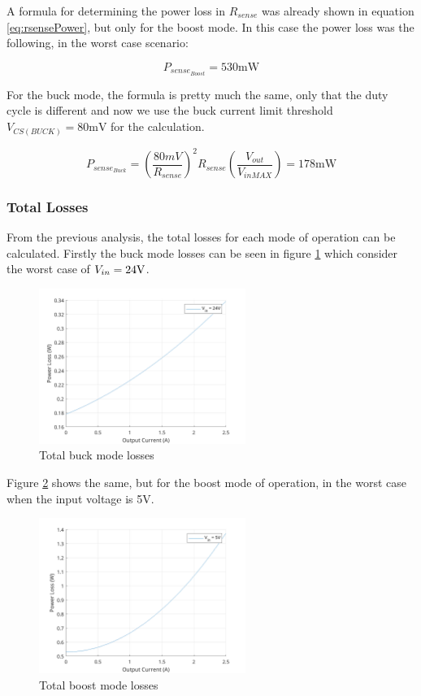 \documentclass[11pt, a4paper]{article}
\begin{document}
A formula for determining the power loss in $R_{sense}$ was already shown in equation \ref{eq:rsensePower}, but only for the boost mode. In this case the power loss was the following, in the worst case scenario:

$$P_{sense_{Boost}} = 530\text{mW}$$

For the buck mode, the formula is pretty much the same, only that the duty cycle is different and now we use the buck current limit threshold $V_{CS(BUCK)} = 80\text{mV}$ for the calculation.

\begin{equation}
    P_{sense_{Buck}} = \left (\frac{80mV}{R_{sense}}\right )^2R_{sense}\left (\frac{V_{out}}{V_{inMAX}}\right ) = 178 \text{mW}
\end{equation}

\subsubsection{Total Losses}

From the previous analysis, the total losses for each mode of operation can be calculated. Firstly the buck mode losses can be seen in figure \ref{fig:totalBuckLosses} which consider the worst case of $V_{in} = 24\text V$. 

\begin{figure}[H]
    \centering
    \includegraphics[width=0.6\textwidth]{./figures/totalBuckLosses.png}
    \caption{Total buck mode losses}
    \label{fig:totalBuckLosses}
\end{figure}

Figure \ref{fig:totalBoostLosses} shows the same, but for the boost mode of operation, in the worst case when the input voltage is 5V.

\begin{figure}[H]
    \centering
    \includegraphics[width=0.6\textwidth]{./figures/totalBoostLosses.png}
    \caption{Total boost mode losses}
    \label{fig:totalBoostLosses}
\end{figure}
\end{document}
